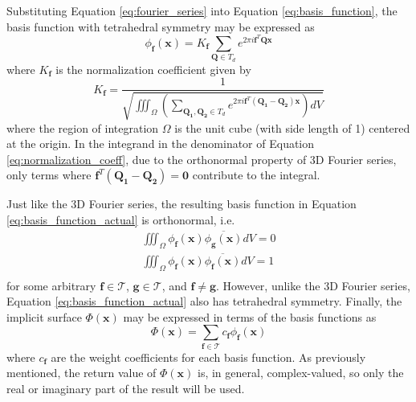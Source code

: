 \documentclass[acmtog]{acmart}
\begin{document}
Substituting Equation \ref{eq:fourier_series} into Equation \ref{eq:basis_function}, the basis function with tetrahedral symmetry may be expressed as
%
\begin{equation}
  \label{eq:basis_function_actual}
  \phi_{\mathbf{f}}(\mathbf{x}) = K_{\mathbf{f}} \sum\limits_{\mathbf{Q} \in T_d} e^{2 \pi i \mathbf{f}^T \mathbf{Q} \mathbf{x}}
\end{equation}
%
where $K_{\mathbf{f}}$ is the normalization coefficient given by
%
\begin{equation}
  \label{eq:normalization_coeff}
  K_{\mathbf{f}} = \frac{1}{\sqrt{ \iiint_\Omega \left( \sum\limits_{\mathbf{Q_1}, \mathbf{Q_2} \in T_d} e^{2 \pi i \mathbf{f}^T (\mathbf{Q_1 - Q_2}) \mathbf{x}} \right) dV }}
\end{equation}
%
where the region of integration $\Omega$ is the unit cube (with side length of 1) centered at the origin. In the integrand in the denominator of Equation \ref{eq:normalization_coeff}, due to the orthonormal property of 3D Fourier series, only terms where $\mathbf{f}^T (\mathbf{Q_1 - Q_2}) = \mathbf{0}$ contribute to the integral.

Just like the 3D Fourier series, the resulting basis function in Equation \ref{eq:basis_function_actual} is orthonormal, i.e.
%
\begin{equation}
  \begin{split}
    \iiint_{\Omega} \phi_{\mathbf{f}}(\mathbf{x}) \overline{\phi_{\mathbf{g}}(\mathbf{x})} dV = 0 \\
    \iiint_{\Omega} \phi_{\mathbf{f}}(\mathbf{x}) \overline{\phi_{\mathbf{f}}(\mathbf{x})} dV = 1 \\
  \end{split}
\end{equation}
%
for some arbitrary $\mathbf{f} \in \mathcal{T}$, $\mathbf{g} \in \mathcal{T}$, and $\mathbf{f} \neq \mathbf{g}$. However, unlike the 3D Fourier series, Equation \ref{eq:basis_function_actual} also has tetrahedral symmetry. Finally, the implicit surface $\Phi(\mathbf{x})$ may be expressed in terms of the basis functions as
%
\begin{equation}
  \Phi(\mathbf{x}) = \sum\limits_{\mathbf{f} \in \mathcal{T}} c_{\mathbf{f}} \phi_{\mathbf{f}}(\mathbf{x})
\end{equation}
%
where $c_{\mathbf{f}}$ are the weight coefficients for each basis function. As previously mentioned, the return value of $\Phi(\mathbf{x})$ is, in general, complex-valued, so only the real or imaginary part of the result will be used.
\end{document}

